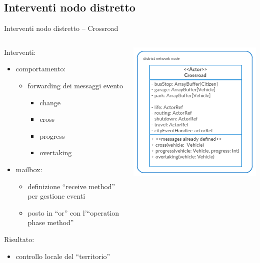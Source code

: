 \subsection{Interventi nodo distretto}
\begin{frame}{Interventi nodo distretto -- \scriptsize{Crossroad}}
	\begin{columns}
		\begin{column}{0.7	\textwidth}
			Interventi:
			\begin{itemize}
				\item{\footnotesize{comportamento:}}
				\begin{itemize}
					\item{\scriptsize{forwarding dei messaggi evento}}
					\begin{itemize}
						\item{\tiny{change}}
						\item{\tiny{cross}}
						\item{\tiny{progress}}
						\item{\tiny{overtaking}}
					\end{itemize}
				\end{itemize}
				\item{\footnotesize{mailbox:}}
				\begin{itemize}
					\item{\scriptsize{definizione ``receive method'' per gestione eventi}}
					\item{\scriptsize{posto in ``or'' con l'``operation phase method''}}
				\end{itemize}
			\end{itemize}
			Risultato:
			\begin{itemize}
				\item{\footnotesize{controllo locale del ``territorio''}}
			\end{itemize}
		\end{column}		
		\begin{column}{0.3\textwidth}
			\centering
			\includegraphics[scale=0.3]{images/crossroad.png}
		\end{column}
	\end{columns}
\end{frame}

